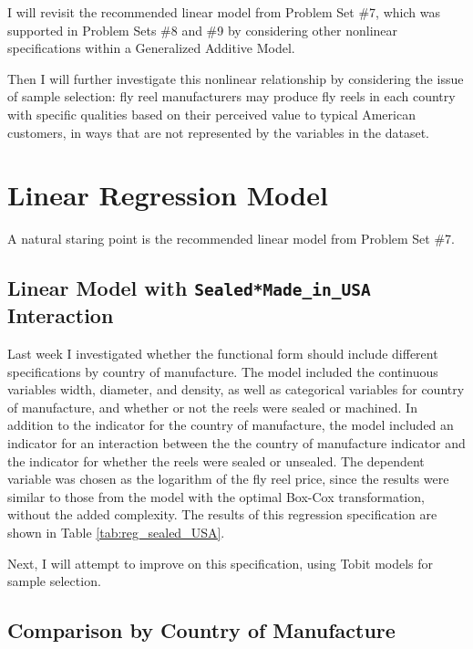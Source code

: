\documentclass[11pt]{paper}
\begin{document}
I will revisit the recommended linear model
from Problem Set \#7, 
which was supported in
Problem Sets \#8 and  \#9 
by considering other nonlinear specifications
within a Generalized Additive Model. 



Then I will further investigate this nonlinear relationship
by considering the issue of sample selection:
fly reel manufacturers 
may produce 
fly reels in each country
with specific qualities based on
their perceived value to typical 
American 
customers, 
in ways that are not represented by the variables in the dataset.



\clearpage
\section{Linear Regression Model}

A natural staring point is the recommended linear model
from Problem Set \#7. 

\subsection{Linear Model with \texttt{Sealed*Made\_in\_USA} Interaction}

Last week I investigated whether 
the functional form should include different specifications by
country of manufacture.
% 
The model included the continuous variables 
width, diameter, and density, 
as well as categorical variables for 
country of manufacture, 
and whether or not the reels were sealed or machined. 
% 
In addition to the indicator for the country of manufacture, the model included an indicator for an interaction between
the the country of manufacture indicator and the indicator for whether the reels were sealed or unsealed. 
% 
The dependent variable was chosen as 
the logarithm of the fly reel price, 
since the results were similar to those from the model 
with the optimal Box-Cox transformation, 
without the added complexity. 
% 
The results of this regression specification are shown in 
Table \ref{tab:reg_sealed_USA}. 
% 

% 
Next, I will attempt to improve on this specification,
using Tobit models for sample selection.





\pagebreak
\subsection{Comparison by Country of Manufacture}
\end{document}
